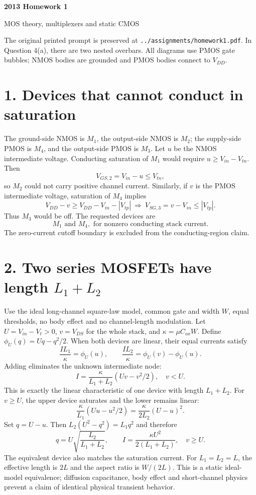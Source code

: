 \documentclass[11pt,a4paper]{article}
\begin{document}
\begin{center}{\Large\bfseries 2013 Homework 1}\par MOS theory, multiplexers and static CMOS\end{center}
The original printed prompt is preserved at \texttt{../assignments/homework1.pdf}.
In Question 4(a), there are two nested overbars. All diagrams use PMOS gate
bubbles; NMOS bodies are grounded and PMOS bodies connect to $V_{DD}$.

\section*{1. Devices that cannot conduct in saturation}
The ground-side NMOS is $M_1$, the output-side NMOS is $M_2$;
the supply-side PMOS is $M_4$, and the output-side PMOS is $M_3$.
Let $u$ be the NMOS intermediate voltage. Conducting saturation of $M_1$
would require $u\ge V_{in}-V_{tn}$. Then
\[
 V_{GS,2}=V_{in}-u\le V_{tn},
\]
so $M_2$ could not carry positive channel current. Similarly, if $v$ is the
PMOS intermediate voltage, saturation of $M_4$ implies
\[
 V_{DD}-v\ge V_{DD}-V_{in}-|V_{tp}|\ \Longrightarrow\
 V_{SG,3}=v-V_{in}\le |V_{tp}|.
\]
Thus $M_3$ would be off. The requested devices are
\[\boxed{M_1\text{ and }M_4,\text{ for nonzero conducting stack current}.}\]
The zero-current cutoff boundary is excluded from the conducting-region claim.

\section*{2. Two series MOSFETs have length $L_1+L_2$}
Use the ideal long-channel square-law model, common gate and width $W$, equal
thresholds, no body effect and no channel-length modulation. Let
$U=V_{in}-V_t>0$, $v=V_{DS}$ for the whole stack, and
$\kappa=\mu C_{ox}W$. Define $\phi_U(q)=Uq-q^2/2$.
When both devices are linear, their equal currents satisfy
\[
 \frac{IL_1}{\kappa}=\phi_U(u),\qquad
 \frac{IL_2}{\kappa}=\phi_U(v)-\phi_U(u).
\]
Adding eliminates the unknown intermediate node:
\[
 \boxed{I=\frac{\kappa}{L_1+L_2}(Uv-v^2/2),\quad v<U.}
\]
This is exactly the linear characteristic of one device with length $L_1+L_2$.
\newpage
For $v\ge U$, the upper device saturates and the lower remains linear:
\[
 \frac{\kappa}{L_1}(Uu-u^2/2)
 =\frac{\kappa}{2L_2}(U-u)^2.
\]
Set $q=U-u$. Then $L_2(U^2-q^2)=L_1q^2$ and therefore
\[
 q=U\sqrt{\frac{L_2}{L_1+L_2}},\qquad
 \boxed{I=\frac{\kappa U^2}{2(L_1+L_2)},\quad v\ge U.}
\]
The equivalent device also matches the saturation current. For $L_1=L_2=L$,
the effective length is $2L$ and the aspect ratio is $W/(2L)$.
This is a static ideal-model equivalence; diffusion capacitance, body effect
and short-channel physics prevent a claim of identical physical transient behavior.
\end{document}
